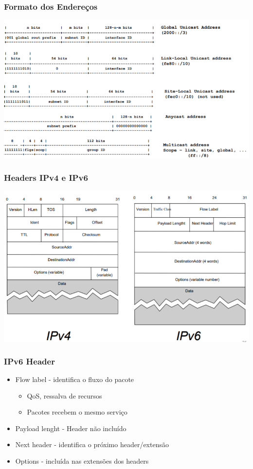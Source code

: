 \documentclass{article}
\begin{document}
\subsubsection{Formato dos Endereços}
\begin{center}
    \includegraphics[width=15cm]{images/RCOM36.png}
\end{center}

\subsubsection{Headers IPv4 e IPv6}
\begin{center}
    \includegraphics[width=14cm]{images/RCOM37.png}
\end{center}

\subsubsection{IPv6 Header}
\begin{itemize}
    \item Flow label - identifica o fluxo do pacote
    \begin{itemize}
        \item QoS, ressalva de recursos
        \item Pacotes recebem o mesmo serviço
    \end{itemize}
    \item Payload lenght - Header não incluído
    \item Next header - identifica o próximo header/extensão
    \item Options - incluída nas extensões dos headers
\end{itemize}
\end{document}
